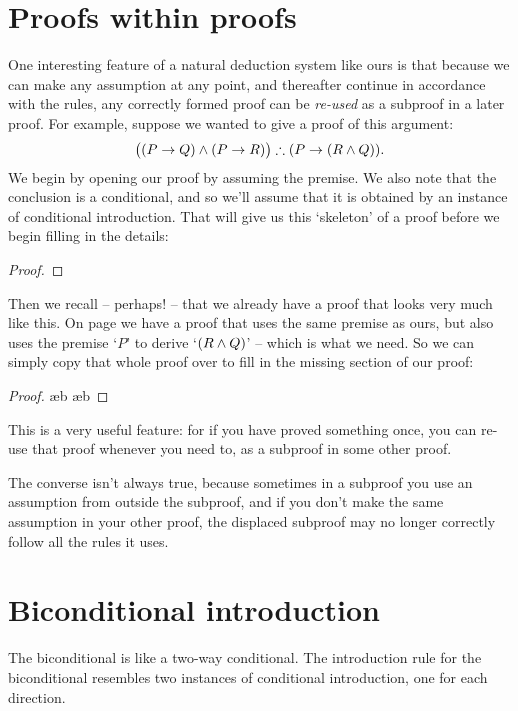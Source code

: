 \section{Proofs within proofs}

One interesting feature of a natural deduction system like ours is that because we can make any assumption at any point, and thereafter continue in accordance with the rules, any correctly formed proof can be \emph{re-used} as a subproof in a later proof. For example, suppose we wanted to give a proof of this argument:  $$\bigl((P \rightarrow Q)\wedge(P \rightarrow R)\bigr) \mathrel{\therefore} (P \rightarrow (R \wedge Q)).$$ We begin by opening our proof by assuming the premise. We also note that the conclusion is a conditional, and so we'll assume that it is obtained by an instance of conditional introduction. That will give us this `skeleton' of a proof before we begin filling in the details:
 \begin{proof}
	\open
	\close
\end{proof}
Then we recall – perhaps! – that we already have a proof that looks very much like this. On page \pageref{proof.within} we have a proof that uses the same premise as ours, but also uses the premise `$P$' to derive `$(R \wedge Q)$' – which is what we need. So we can simply copy that whole proof over to fill in the missing section of our proof:
 \begin{proof}
	\open
	\ae{b}
	\ae{b}
	\close
\end{proof}
This is a very useful feature: for if you have proved something once, you can re-use that proof whenever you need to, as a subproof in some other proof. 

The converse isn't always true, because sometimes in a subproof you use an assumption from outside the subproof, and if you don't make the same assumption in your other proof, the displaced subproof may no longer correctly follow all the rules it uses. 



\section{Biconditional introduction} \label{biint} 
The biconditional is like a two-way conditional. The introduction rule for the biconditional resembles two instances of conditional introduction, one for each direction.

